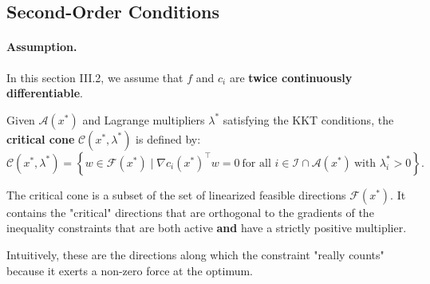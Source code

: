 \subsection{Second-Order Conditions}

\paragraph{Assumption.} In this section III.2, we assume that $f$ and $c_i$ are \textbf{twice continuously differentiable}.

\begin{definition}
    Given $\mathcal{A}(x^*)$ and Lagrange multipliers $\lambda^*$ satisfying the KKT conditions, the \textbf{critical cone} $\mathcal{C}(x^*, \lambda^*)$ is defined by:
    \begin{equation}
        \mathcal{C}(x^*, \lambda^*) = \left\{ w \in \mathcal{F}(x^*) \mid \nabla c_i(x^*)^\top w = 0 \ \text{for all } i \in \mathcal{I} \cap \mathcal{A}(x^*) \ \text{with } \lambda_i^* > 0 \right\}.
    \end{equation}
\end{definition}

\begin{remarque}
    The critical cone is a subset of the set of linearized feasible directions $\mathcal{F}(x^*)$. It contains the "critical" directions that are orthogonal to the gradients of the inequality constraints that are both active \textbf{and} have a strictly positive multiplier.
    
    Intuitively, these are the directions along which the constraint "really counts" because it exerts a non-zero force at the optimum.
\end{remarque}

